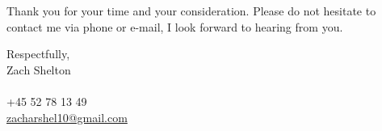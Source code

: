 \documentclass[11pt,a4]{article}
\begin{document}
Thank you for your time and your consideration. Please do not hesitate to contact me via phone or e-mail, I look forward to
hearing from you.
\par

\vspace{0.5cm}
\raggedright
Respectfully, \\ Zach Shelton \\ \\ +45 52 78 13 49 \\ 
\href{mailto:zshelton1997@gmail.com}{zacharshel10@gmail.com} 
\end{document}
